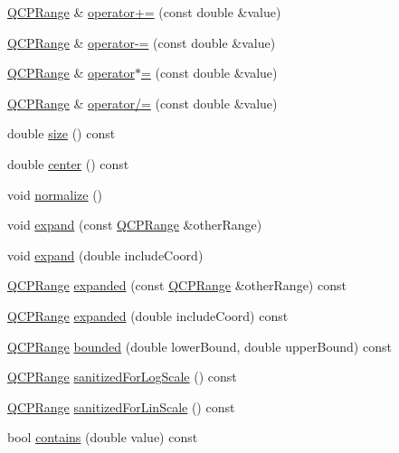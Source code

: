 \begin{DoxyCompactItemize}
\item 
\hyperlink{classQCPRange}{Q\+C\+P\+Range} \& \hyperlink{classQCPRange_afea7c1aa7d08f061cd9bd8832f957df8}{operator+=} (const double \&value)
\item 
\hyperlink{classQCPRange}{Q\+C\+P\+Range} \& \hyperlink{classQCPRange_a95894bcb15a16a75ca564091374e2191}{operator-\/=} (const double \&value)
\item 
\hyperlink{classQCPRange}{Q\+C\+P\+Range} \& \hyperlink{classQCPRange_a6876aa9620ff2f0f7f1873f998372cef}{operator$\ast$=} (const double \&value)
\item 
\hyperlink{classQCPRange}{Q\+C\+P\+Range} \& \hyperlink{classQCPRange_a6137d8682b6835ace840730b4c1e2d63}{operator/=} (const double \&value)
\item 
double \hyperlink{classQCPRange_afa57c13049b965edb6fd1c00ac56338a}{size} () const 
\item 
double \hyperlink{classQCPRange_a3825b53cf17da5de0843c1f3baad07db}{center} () const 
\item 
void \hyperlink{classQCPRange_af914a7740269b0604d0827c634a878a9}{normalize} ()
\item 
void \hyperlink{classQCPRange_a0fa1bc8048be50d52bea93a8caf08305}{expand} (const \hyperlink{classQCPRange}{Q\+C\+P\+Range} \&other\+Range)
\item 
void \hyperlink{classQCPRange_a5fa977db0a4b7800075c629c62cf5e80}{expand} (double include\+Coord)
\item 
\hyperlink{classQCPRange}{Q\+C\+P\+Range} \hyperlink{classQCPRange_a6437bdf29a7ebc2c88a6045c4e622384}{expanded} (const \hyperlink{classQCPRange}{Q\+C\+P\+Range} \&other\+Range) const 
\item 
\hyperlink{classQCPRange}{Q\+C\+P\+Range} \hyperlink{classQCPRange_a932046218e2b8b93b4be0a1d270b63c2}{expanded} (double include\+Coord) const 
\item 
\hyperlink{classQCPRange}{Q\+C\+P\+Range} \hyperlink{classQCPRange_a7ad9b4f4f53bd28c98b183d750abaddf}{bounded} (double lower\+Bound, double upper\+Bound) const 
\item 
\hyperlink{classQCPRange}{Q\+C\+P\+Range} \hyperlink{classQCPRange_aaf6a9046e78d91eeb8e89584fe46b034}{sanitized\+For\+Log\+Scale} () const 
\item 
\hyperlink{classQCPRange}{Q\+C\+P\+Range} \hyperlink{classQCPRange_a1ff029704c29a75adbc1dc36cecaf44c}{sanitized\+For\+Lin\+Scale} () const 
\item 
bool \hyperlink{classQCPRange_a030ce95b527c32e01414d0351347b46d}{contains} (double value) const 
\end{DoxyCompactItemize}

